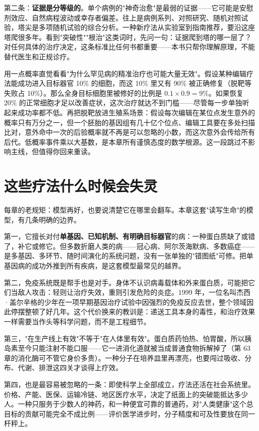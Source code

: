 第二条：\textbf{证据是分等级的}。单个病例的"神奇治愈"是最弱的证据——它可能是安慰剂效应、自然病程波动或幸存者偏差。往上是病例系列、对照研究、随机对照试验，塔尖是多项随机试验的综合分析。一种新疗法从实验室到指南推荐，要沿这座塔爬很多年。看到"突破性""根治"这类词时，先问一句：证据爬到塔的哪一层了？对任何具体的治疗决定，这条标准比任何书都重要——本书只帮你理解原理，不能替代医生和正规诊疗。

\begin{tiaozhan}
用一点概率直觉看看"为什么罕见病的精准治疗也可能大量无效"。假设某种编辑疗法能成功进入目标器官 10\% 的细胞，而这 10\% 里又有 90\% 被正确修复（脱靶等失败占 10\%）。那么全身目标细胞里被修好的比例是 $0.1\times0.9=9\%$。如果恢复 20\% 的正常细胞才足以改善症状，这次治疗就达不到门槛——尽管每一步单独听起来成功率都不低。再把脱靶放进生殖系场景：假设每次编辑在某位点发生意外的概率只有万分之一，但一个胚胎的基因组有几十亿个位点、编辑工具要在多处扫描比对，意外命中一次的后验概率就不再是可以忽略的小数，而这次意外会传给所有后代。低概率事件乘以大基数，是本章所有谨慎态度的数学根源。这一段跳过不影响主线，但值得你回来重读。
\end{tiaozhan}

\section{这些疗法什么时候会失灵}

每章的老规矩：模型再好，也要说清楚它在哪里会翻车。本章这套"读写生命"的模型，有几条明确的边界。

第一，它擅长对付\textbf{单基因、已知机制、有明确目标器官}的病：一种蛋白质缺了或错了，补它或修它。但多数折磨人类的病——冠心病、阿尔茨海默病、多数癌症——是多基因、多环节、随时间演化的系统问题，没有一张单独的"错图纸"可修。把单基因病的成功外推到所有疾病，是这套模型最常见的越界。

第二，免疫系统既是帮手也是对手。身体不认识病毒载体和外来蛋白质，可能把它们当敌人攻击：轻则让治疗失效，重则引发危险的炎症。1999 年，一位名叫杰西·盖尔辛格的少年在一项早期基因治疗试验中因强烈的免疫反应去世，整个领域因此停摆整顿了好几年。这个代价换来的教训是：递送工具本身的毒性，和治疗效果一样需要当作头等科学问题，而不是工程细节。

第三，"在生产线上有效"不等于"在人体里有效"。蛋白质药怕热、怕胃酸，所以胰岛素至今只能注射不能口服——它一进消化道就被当成普通食物拆解掉了（第 63 章的消化酶可不管它身价多贵）。一种分子在培养皿里再漂亮，也要闯过吸收、分布、代谢、排泄这四关才谈得上疗效。

第四，也是最容易被忽略的一条：即使科学上全部成立，疗法还活在社会系统里。价格、产能、医保、运输冷链、地区医疗水平，决定了纸面上的突破能抵达多少人。一种只服务于少数人的神药，和一种便宜可靠的普通药，对"人类健康"这个总目标的贡献可能完全不成比例——评价医学进步时，分子精度和可及性要放在同一杆秤上。


